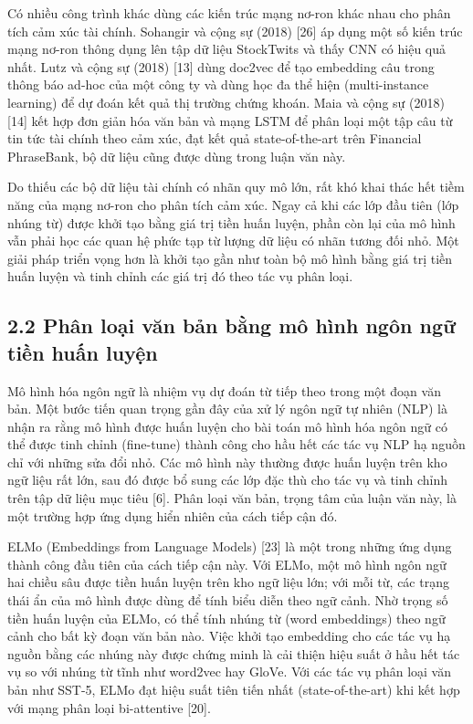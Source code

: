 Có nhiều công trình khác dùng các kiến trúc mạng nơ-ron khác nhau cho phân tích cảm xúc tài chính. Sohangir và cộng sự (2018) {[}26{]} áp dụng một số kiến trúc mạng nơ-ron thông dụng lên tập dữ liệu StockTwits và thấy CNN có hiệu quả nhất. Lutz và cộng sự (2018) {[}13{]} dùng doc2vec để tạo embedding câu trong thông báo ad-hoc của một công ty và dùng học đa thể hiện (multi-instance learning) để dự đoán kết quả thị trường chứng khoán. Maia và cộng sự (2018) {[}14{]} kết hợp đơn giản hóa văn bản và mạng LSTM để phân loại một tập câu từ tin tức tài chính theo cảm xúc, đạt kết quả state-of-the-art trên Financial PhraseBank, bộ dữ liệu cũng được dùng trong luận văn này.

Do thiếu các bộ dữ liệu tài chính có nhãn quy mô lớn, rất khó khai thác hết tiềm năng của mạng nơ-ron cho phân tích cảm xúc. Ngay cả khi các lớp đầu tiên (lớp nhúng từ) được khởi tạo bằng giá trị tiền huấn luyện, phần còn lại của mô hình vẫn phải học các quan hệ phức tạp từ lượng dữ liệu có nhãn tương đối nhỏ. Một giải pháp triển vọng hơn là khởi tạo gần như toàn bộ mô hình bằng giá trị tiền huấn luyện và tinh chỉnh các giá trị đó theo tác vụ phân loại.

\subsection{2.2 Phân loại văn bản bằng mô hình ngôn ngữ tiền huấn luyện}

Mô hình hóa ngôn ngữ là nhiệm vụ dự đoán từ tiếp theo trong một đoạn văn bản. Một bước tiến quan trọng gần đây của xử lý ngôn ngữ tự nhiên (NLP) là nhận ra rằng mô hình được huấn luyện cho bài toán mô hình hóa ngôn ngữ có thể được tinh chỉnh (fine-tune) thành công cho hầu hết các tác vụ NLP hạ nguồn chỉ với những sửa đổi nhỏ. Các mô hình này thường được huấn luyện trên kho ngữ liệu rất lớn, sau đó được bổ sung các lớp đặc thù cho tác vụ và tinh chỉnh trên tập dữ liệu mục tiêu {[}6{]}. Phân loại văn bản, trọng tâm của luận văn này, là một trường hợp ứng dụng hiển nhiên của cách tiếp cận đó.

ELMo (Embeddings from Language Models) {[}23{]} là một trong những ứng dụng thành công đầu tiên của cách tiếp cận này. Với ELMo, một mô hình ngôn ngữ hai chiều sâu được tiền huấn luyện trên kho ngữ liệu lớn; với mỗi từ, các trạng thái ẩn của mô hình được dùng để tính biểu diễn theo ngữ cảnh. Nhờ trọng số tiền huấn luyện của ELMo, có thể tính nhúng từ (word embeddings) theo ngữ cảnh cho bất kỳ đoạn văn bản nào. Việc khởi tạo embedding cho các tác vụ hạ nguồn bằng các nhúng này được chứng minh là cải thiện hiệu suất ở hầu hết tác vụ so với nhúng từ tĩnh như word2vec hay GloVe. Với các tác vụ phân loại văn bản như SST-5, ELMo đạt hiệu suất tiên tiến nhất (state-of-the-art) khi kết hợp với mạng phân loại bi-attentive {[}20{]}.

